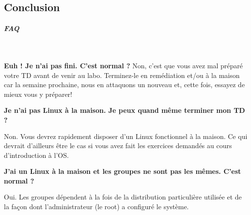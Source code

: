 \documentclass[a4paper,11pt]{style-esi/td}
\begin{document}
        \subsection{Conclusion}

\subparagraph{FAQ} 

\textcolor{white}{.} %

\par
\textbf{Euh ! Je n'ai pas fini. C'est normal ?}
Non, c'est que vous avez mal préparé votre TD avant de venir au labo. 
Terminez-le en remédiation et/ou à la maison car la semaine prochaine, 
nous en attaquons un nouveau et, cette fois, essayez de mieux vous y préparer!  

\par
\textbf{Je n'ai pas Linux à la maison. Je peux quand m\^eme terminer mon TD ?}
\par

Non. Vous devrez rapidement disposer d'un Linux fonctionnel à la maison.
Ce qui devrait d'ailleurs \^etre le cas si vous avez fait
les exercices demandés au cours d'introduction à l'OS.

\par
\textbf{J'ai un Linux à la maison et les groupes ne sont pas les m\^emes. C'est normal ?}
\par

Oui. 
Les groupes dépendent à la fois de la distribution particulière utilisée
et de la fa\c con dont l'administrateur (le root) a configuré le système.   

\par
\end{document}
